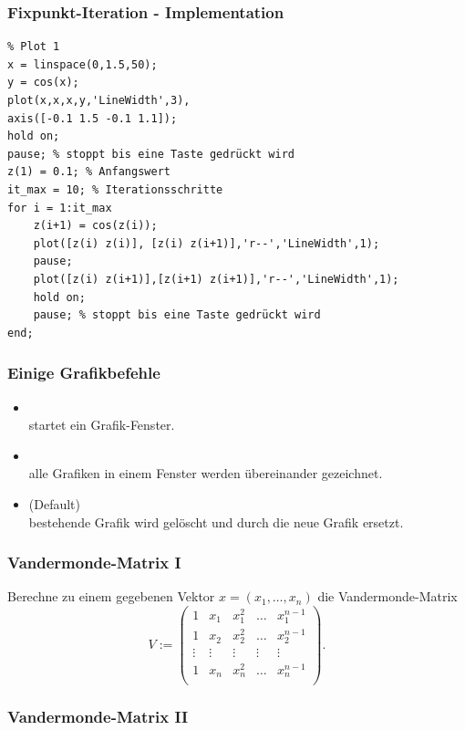 \documentclass[hyperref={xetex}]{beamer}
\begin{document}
%
%
\begin{frame}[fragile]\frametitle{Fixpunkt-Iteration - Implementation}
\begin{lstlisting}
% Plot 1
x = linspace(0,1.5,50);
y = cos(x);
plot(x,x,x,y,'LineWidth',3),
axis([-0.1 1.5 -0.1 1.1]);
hold on;
pause; % stoppt bis eine Taste gedrückt wird
z(1) = 0.1; % Anfangswert
it_max = 10; % Iterationsschritte 
for i = 1:it_max
    z(i+1) = cos(z(i));
    plot([z(i) z(i)], [z(i) z(i+1)],'r--','LineWidth',1);
    pause;
    plot([z(i) z(i+1)],[z(i+1) z(i+1)],'r--','LineWidth',1);
    hold on;
    pause; % stoppt bis eine Taste gedrückt wird
end;
\end{lstlisting}
\end{frame}
%
%
\begin{frame}[fragile]\frametitle{Einige Grafikbefehle}
\begin{itemize}
\item \alert{ } \\
startet ein Grafik-Fenster.
\item \alert{ }\\
 alle Grafiken in einem Fenster werden \"ubereinander gezeichnet. 
\item \alert{ } (Default)\\
 bestehende Grafik wird gel\"oscht und durch die neue Grafik ersetzt.
\end{itemize}
\end{frame}
\begin{frame}[fragile]\frametitle{Vandermonde-Matrix I}
Berechne zu einem gegebenen Vektor
  $x=(x_1, \dots ,x_n)$ die Vandermonde-Matrix
{ \[ V:= \left(\begin{array}{ccccc} 
1 & x_1 & x_1^2 & \hdots & x_1^{n-1}\\
1 & x_2 & x_2^2 & \hdots & x_2^{n-1}\\
\vdots & \vdots & \vdots & \vdots & \vdots\\
1 & x_n & x_n^2 & \hdots & x_n^{n-1}\\
\end{array} \right).  \]}
\end{frame}
%
%
%
\begin{frame}[fragile]\frametitle{Vandermonde-Matrix II}

\end{frame}
\end{document}
